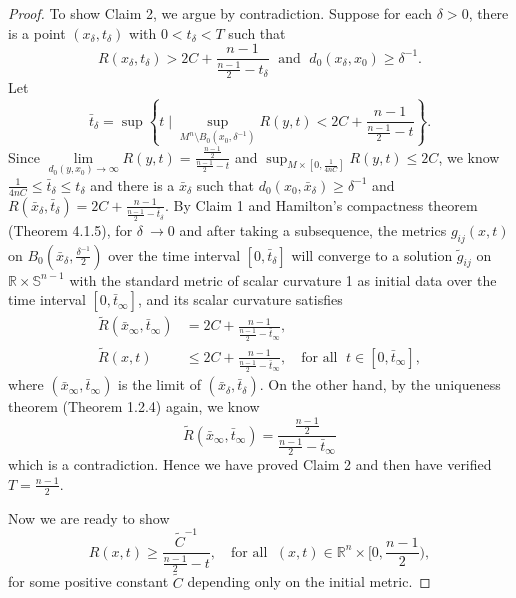 \begin{proof}
To show Claim 2, we argue by contradiction. Suppose for each
$\delta>0$, there is a point $(x_{\delta},t_{\delta})$ with
$0<t_{\delta}<T $ such that
$$
R(x_{\delta},t_{\delta})>2C+\frac{n-1}{\frac{n-1}{2}-t_{\delta}}\;
\mbox{ and }\; d_{0}(x_{\delta},x_{0})\geq \delta^{-1}.
$$
Let
$$
\bar{t}_{\delta}=\sup\left\{t\; \Big|\; \sup_{M^{n} \setminus
B_{0}(x_{0},\delta^{-1})}
R(y,t)<2C+\frac{n-1}{\frac{n-1}{2}-t}\right\}.
$$
Since $\lim\limits_{d_{0}(y,x_{0})\rightarrow\infty}R(y,t)
=\frac{\frac{n-1}{2}}{\frac{n-1}{2}-t}$ and
$\sup_{M\times[0,\frac{1}{4nC}]}R(y,t)\leq 2C$, we know
$\frac{1}{4nC}\leq \bar{t}_{\delta}\leq t_{\delta}$ and there is a
$\bar{x}_{\delta}$ such that
$d_{0}(x_{0},\bar{x}_{\delta})\geq\delta^{-1}$ and
$R(\bar{x}_{\delta},\bar{t}_{\delta})
=2C+\frac{n-1}{\frac{n-1}{2}-\bar{t}_{\delta}}.$ By Claim 1 and
Hamilton's compactness theorem (Theorem 4.1.5), for $\delta\
\rightarrow 0$ and after taking a subsequence, the metrics
$g_{ij}(x,t)$ on $B_{0}(\bar{x}_{\delta},\frac{\delta^{-1}}{2})$
over the time interval $[0,\bar{t}_{\delta}]$ will converge to a
solution $\tilde{g}_{ij}$ on $\mathbb{R}\times \mathbb{S}^{n-1}$
with the standard metric of scalar curvature 1 as initial data
over the time interval $[0,\bar{t}_{\infty}]$, and its scalar
curvature satisfies
\begin{align*}
\tilde{R}(\bar{x}_{\infty},\bar{t}_{\infty})
&  = 2C+\frac{n-1}{\frac{n-1}{2}-\bar{t}_{\infty}},\\
\tilde{R}(x,t)&  \leqslant
2C+\frac{n-1}{\frac{n-1}{2}-\bar{t}_{\infty}},
 \quad \mbox{for all }\;  t\in [0,\bar{t}_{\infty}],
\end{align*}
where $(\bar{x}_{\infty},\bar{t}_{\infty})$ is the limit of
$(\bar{x}_{\delta},\bar{t}_{\delta})$. On the other hand, by the
uniqueness theorem (Theorem 1.2.4) again, we know
$$
\tilde{R}(\bar{x}_{\infty},\bar{t}_{\infty})
=\frac{\frac{n-1}{2}}{\frac{n-1}{2}-\bar{t}_{\infty}}
$$
which is a contradiction.  Hence we have proved Claim 2 and then
have verified $T=\frac{n-1}{2}$.

Now we are ready to show \begin{equation} R(x,t)\geq
\frac{\tilde{C}^{-1}}{\frac{n-1}{2}-t}, \quad \text{for all }\;
(x,t)\in \mathbb{R}^{n}\times\Big[0,\frac{n-1}{2}\Big),
\end{equation} for some positive constant $\tilde{C}$ depending only on the
initial metric.


\end{proof}
